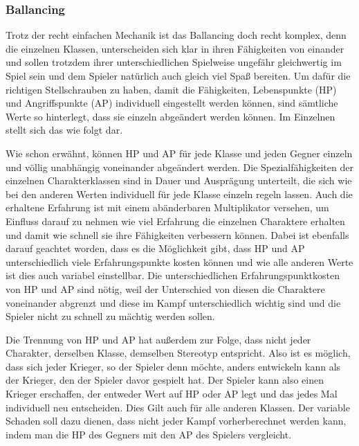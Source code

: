 \subsubsection{Ballancing} Trotz der recht einfachen Mechanik ist das Ballancing doch recht komplex, denn die einzelnen Klassen, unterscheiden sich klar in ihren Fähigkeiten von einander und sollen trotzdem ihrer unterschiedlichen Spielweise ungefähr gleichwertig im Spiel sein und dem Spieler natürlich auch gleich viel Spaß bereiten. Um dafür die richtigen Stellschrauben zu haben, damit die Fähigkeiten, Lebenspunkte (HP) und Angriffspunkte (AP) individuell eingestellt werden können, sind sämtliche Werte so hinterlegt, dass sie einzeln abgeändert werden können. Im Einzelnen stellt sich das wie folgt dar. 

Wie schon erwähnt, können HP und AP für jede Klasse und jeden Gegner einzeln und völlig unabhängig voneinander abgeändert werden. Die Spezialfähigkeiten der einzelnen Charakterklassen sind in Dauer und Ausprägung unterteilt, die sich wie bei den anderen Werten individuell für jede Klasse einzeln regeln lassen. Auch die erhaltene Erfahrung ist mit einem abänderbaren Multiplikator versehen, um Einfluss darauf zu nehmen wie viel Erfahrung die einzelnen Charaktere erhalten und damit wie schnell sie ihre Fähigkeiten verbessern können. Dabei ist ebenfalls darauf geachtet worden, dass es die Möglichkeit gibt, dass HP und AP unterschiedlich viele Erfahrungspunkte kosten können und wie alle anderen Werte ist dies auch variabel einstellbar. Die unterschiedlichen Erfahrungspunktkosten von HP und AP sind nötig, weil der Unterschied von diesen die Charaktere voneinander abgrenzt und diese im Kampf unterschiedlich wichtig sind und die Spieler nicht zu schnell zu mächtig werden sollen.

Die Trennung von HP und AP hat außerdem zur Folge, dass nicht jeder Charakter, derselben Klasse, demselben Stereotyp entspricht. Also ist es möglich, dass sich jeder Krieger, so der Spieler denn möchte, anders entwickeln kann als der Krieger, den der Spieler davor gespielt hat. Der Spieler kann also einen Krieger erschaffen, der entweder Wert auf HP oder AP legt und das jedes Mal individuell neu entscheiden. Dies Gilt auch für alle anderen Klassen. Der variable Schaden soll dazu dienen, dass nicht jeder Kampf vorherberechnet werden kann, indem man die HP des Gegners mit den AP des Spielers vergleicht.

